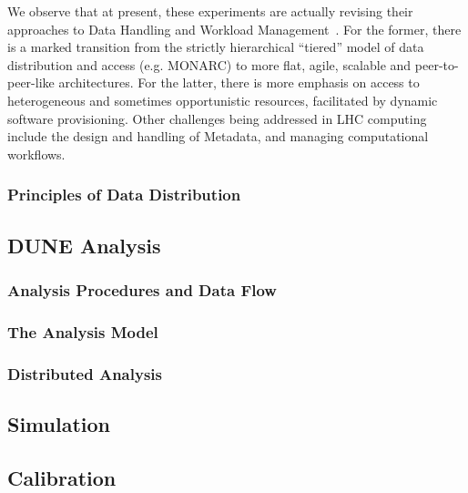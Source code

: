 We observe that at present, these experiments are actually revising their approaches to Data Handling and Workload Management~\cite{lhc_model_update}.
For the former, there is a marked transition from the strictly hierarchical “tiered” model of data distribution and access (e.g. MONARC) to more flat, agile, scalable and peer-to-peer-like architectures. For the latter, there is more emphasis on access to heterogeneous and sometimes opportunistic resources, facilitated by dynamic software provisioning. Other challenges being addressed in LHC computing include the design and handling of Metadata, and managing computational workflows.


\subsubsection{Principles of Data Distribution}

\subsection{DUNE Analysis}
\subsubsection{Analysis Procedures and Data Flow}
\subsubsection{The Analysis Model}
\subsubsection{Distributed Analysis}

\subsection{Simulation}
\subsection{Calibration}
